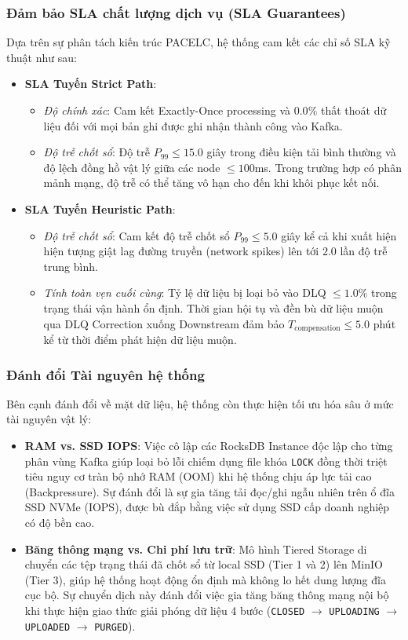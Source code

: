 \documentclass[12pt,a4paper]{article}
\begin{document}
\subsubsection{Đảm bảo SLA chất lượng dịch vụ (SLA Guarantees)}
Dựa trên sự phân tách kiến trúc PACELC, hệ thống cam kết các chỉ số SLA kỹ thuật như sau:
\begin{itemize}[leftmargin=*]
    \item \textbf{SLA Tuyến Strict Path}:
    \begin{itemize}
        \item \textit{Độ chính xác}: Cam kết Exactly-Once processing và $0.0\%$ thất thoát dữ liệu đối với mọi bản ghi được ghi nhận thành công vào Kafka.
        \item \textit{Độ trễ chốt sổ}: Độ trễ $P_{99} \le 15.0$ giây trong điều kiện tải bình thường và độ lệch đồng hồ vật lý giữa các node $\le 100$ms. Trong trường hợp có phân mảnh mạng, độ trễ có thể tăng vô hạn cho đến khi khôi phục kết nối.
    \end{itemize}
    \item \textbf{SLA Tuyến Heuristic Path}:
    \begin{itemize}
        \item \textit{Độ trễ chốt sổ}: Cam kết độ trễ chốt sổ $P_{99} \le 5.0$ giây kể cả khi xuất hiện hiện tượng giật lag đường truyền (network spikes) lên tới $2.0$ lần độ trễ trung bình.
        \item \textit{Tính toàn vẹn cuối cùng}: Tỷ lệ dữ liệu bị loại bỏ vào DLQ $\le 1.0\%$ trong trạng thái vận hành ổn định. Thời gian hội tụ và đền bù dữ liệu muộn qua DLQ Correction xuống Downstream đảm bảo $T_{\mathrm{compensation}} \le 5.0$ phút kể từ thời điểm phát hiện dữ liệu muộn.
    \end{itemize}
\end{itemize}

\subsubsection{Đánh đổi Tài nguyên hệ thống}
Bên cạnh đánh đổi về mặt dữ liệu, hệ thống còn thực hiện tối ưu hóa sâu ở mức tài nguyên vật lý:
\begin{itemize}[leftmargin=*]
    \item \textbf{RAM vs. SSD IOPS}: Việc cô lập các RocksDB Instance độc lập cho từng phân vùng Kafka giúp loại bỏ lỗi chiếm dụng file khóa \texttt{LOCK} đồng thời triệt tiêu nguy cơ tràn bộ nhớ RAM (OOM) khi hệ thống chịu áp lực tải cao (Backpressure). Sự đánh đổi là sự gia tăng tải đọc/ghi ngẫu nhiên trên ổ đĩa SSD NVMe (IOPS), được bù đắp bằng việc sử dụng SSD cấp doanh nghiệp có độ bền cao.
    \item \textbf{Băng thông mạng vs. Chi phí lưu trữ}: Mô hình Tiered Storage di chuyển các tệp trạng thái đã chốt sổ từ local SSD (Tier 1 và 2) lên MinIO (Tier 3), giúp hệ thống hoạt động ổn định mà không lo hết dung lượng đĩa cục bộ. Sự chuyển dịch này đánh đổi việc gia tăng băng thông mạng nội bộ khi thực hiện giao thức giải phóng dữ liệu 4 bước (\texttt{CLOSED} $\rightarrow$ \texttt{UPLOADING} $\rightarrow$ \texttt{UPLOADED} $\rightarrow$ \texttt{PURGED}).
\end{itemize}
\end{document}
